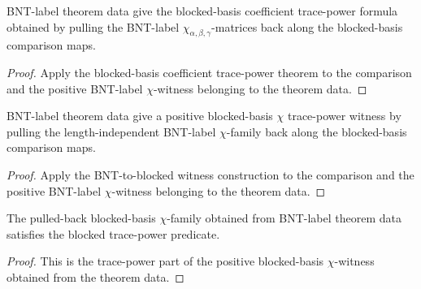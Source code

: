 \begin{theorem}%
    \label{thm:mpdo_bnt_label_theorem_data_blocked_coeff_eq_trace_pow}
    \leanok
    BNT-label theorem data give the blocked-basis coefficient trace-power
    formula obtained by pulling the BNT-label
    $\chi_{\alpha,\beta,\gamma}$-matrices back along the blocked-basis
    comparison maps.
\end{theorem}
\begin{proof}\leanok
    Apply the blocked-basis coefficient trace-power theorem to the comparison
    and the positive BNT-label $\chi$-witness belonging to the theorem data.
\end{proof}

\begin{theorem}%
    \label{thm:mpdo_bnt_label_theorem_data_to_positive_blocked_chi_trace_power_form}
    \leanok
    BNT-label theorem data give a positive blocked-basis $\chi$ trace-power
    witness by pulling the length-independent BNT-label $\chi$-family back
    along the blocked-basis comparison maps.
\end{theorem}
\begin{proof}\leanok
    Apply the BNT-to-blocked witness construction to the comparison and the
    positive BNT-label $\chi$-witness belonging to the theorem data.
\end{proof}

\begin{theorem}%
    \label{thm:mpdo_bnt_label_theorem_data_positive_blocked_chi_trace_power}
    \leanok
    The pulled-back blocked-basis $\chi$-family obtained from BNT-label
    theorem data satisfies the blocked trace-power predicate.
\end{theorem}
\begin{proof}\leanok
    This is the trace-power part of the positive blocked-basis
    $\chi$-witness obtained from the theorem data.
\end{proof}


